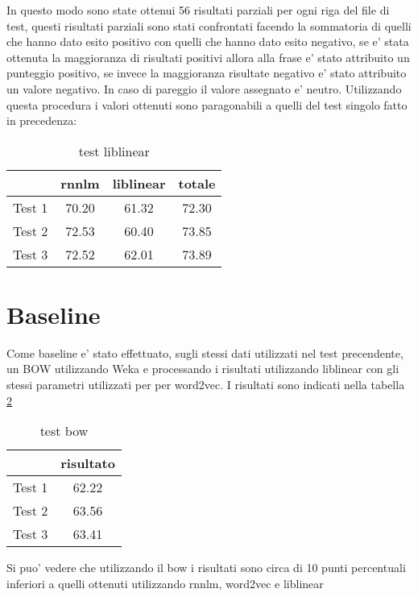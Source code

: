 \documentclass[a4paper,11pt]{book}
\theoremstyle{definition}
\begin{document}
In questo modo sono state ottenui 56 risultati parziali per ogni riga del file di test, questi risultati parziali sono stati confrontati facendo la sommatoria di quelli che hanno dato esito positivo con quelli che hanno dato esito negativo, se e' stata ottenuta la maggioranza di risultati positivi allora alla frase e' stato attribuito un punteggio positivo, se invece la maggioranza risultate negativo e' stato attribuito un valore negativo. In caso di pareggio il valore assegnato e' neutro.
Utilizzando questa procedura i valori ottenuti sono paragonabili a quelli del  test singolo fatto in precedenza:
\begin{table}[h]
\begin{center}
\begin{tabular}{|c|c|c|c|}
\hline
& rnnlm & liblinear & totale \\
\hline
\hline
Test 1 & 70.20 & 61.32 & 72.30 \\
\hline
Test 2 & 72.53 & 60.40 & 73.85  \\
\hline
Test 3 & 72.52 & 62.01 & 73.89 \\
\hline
\end{tabular}
\end{center}
\caption{test liblinear}
\label{tab:test3}
\end{table}

\section{Baseline}
Come baseline e' stato effettuato, sugli stessi dati utilizzati nel test precendente, un BOW utilizzando Weka e processando i risultati utilizzando liblinear con gli stessi parametri utilizzati per per word2vec. I risultati sono indicati nella tabella \ref{tab:baseTest1}
\begin{table}[h]
\begin{center}
\begin{tabular}{|c|c|}
\hline
& risultato  \\
\hline
\hline
Test 1 & 62.22 \\
\hline
Test 2 & 63.56 \\
\hline
Test 3 & 63.41 \\
\hline
\end{tabular}
\end{center}
\caption{test bow}
\label{tab:baseTest1}
\end{table}

Si puo' vedere che utilizzando il bow i risultati sono circa di 10 punti percentuali inferiori a quelli ottenuti utilizzando rnnlm, word2vec e liblinear
\end{document}
